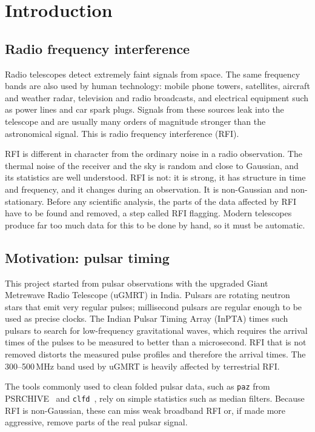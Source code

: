\chapter{Introduction}
\label{ch:intro}

\section{Radio frequency interference}
Radio telescopes detect extremely faint signals from space. The same frequency
bands are also used by human technology: mobile phone towers, satellites,
aircraft and weather radar, television and radio broadcasts, and electrical
equipment such as power lines and car spark plugs. Signals from these sources
leak into the telescope and are usually many orders of magnitude stronger than
the astronomical signal. This is radio frequency interference (RFI).

RFI is different in character from the ordinary noise in a radio observation.
The thermal noise of the receiver and the sky is random and close to Gaussian,
and its statistics are well understood. RFI is not: it is strong, it has
structure in time and frequency, and it changes during an observation. It is
non-Gaussian and non-stationary. Before any scientific analysis, the parts of
the data affected by RFI have to be found and removed, a step called RFI
flagging. Modern telescopes produce far too much data for this to be done by
hand, so it must be automatic.

\section{Motivation: pulsar timing}
This project started from pulsar observations with the upgraded Giant
Metrewave Radio Telescope (uGMRT) in India. Pulsars are rotating neutron stars
that emit very regular pulses; millisecond pulsars are regular enough to be
used as precise clocks. The Indian Pulsar Timing Array (InPTA) times such
pulsars to search for low-frequency gravitational waves, which requires the
arrival times of the pulses to be measured to better than a microsecond. RFI
that is not removed distorts the measured pulse profiles and therefore the
arrival times. The 300--500\,MHz band used by uGMRT is heavily affected by
terrestrial RFI.

The tools commonly used to clean folded pulsar data, such as \texttt{paz}
from PSRCHIVE~\cite{vanstraten2012psrchive} and \texttt{clfd}~\cite{clfd}, rely
on simple statistics such as median filters. Because RFI is non-Gaussian, these
can miss weak broadband RFI or, if made more aggressive, remove parts of the
real pulsar signal.

